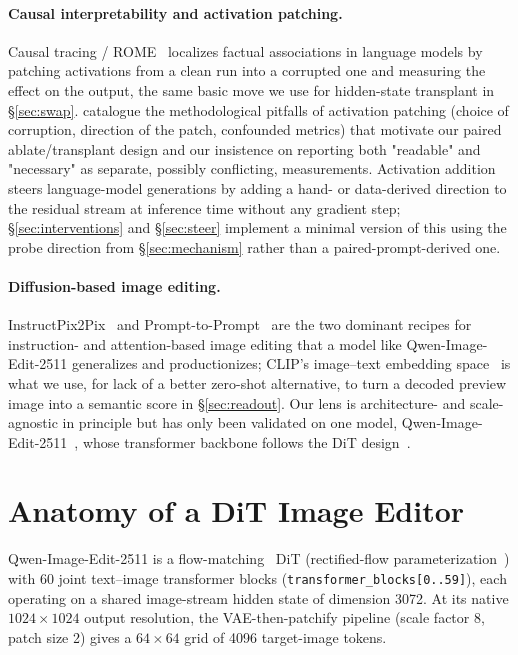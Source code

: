 \documentclass[10pt,twocolumn]{article}
\newcommand{\model}{Qwen-Image-Edit-2511}
\begin{document}
\paragraph{Causal interpretability and activation patching.} Causal
tracing / ROME~\citep{meng2022rome} localizes factual associations in
language models by patching activations from a clean run into a
corrupted one and measuring the effect on the output, the same basic
move we use for hidden-state transplant in \S\ref{sec:swap}.
\citet{heimersheim2024activation} catalogue the methodological pitfalls
of activation patching (choice of corruption, direction of the patch,
confounded metrics) that motivate our paired ablate/transplant design
and our insistence on reporting both "readable" and "necessary" as
separate, possibly conflicting, measurements. Activation
addition~\citep{turner2023actadd} steers language-model generations by
adding a hand- or data-derived direction to the residual stream at
inference time without any gradient step; \S\ref{sec:interventions} and
\S\ref{sec:steer} implement a minimal version of this using the
probe direction from \S\ref{sec:mechanism} rather than a
paired-prompt-derived one.

\paragraph{Diffusion-based image editing.} InstructPix2Pix~\citep{brooks2023instructpix2pix}
and Prompt-to-Prompt~\citep{hertz2023prompttoprompt} are the two
dominant recipes for instruction- and attention-based image editing that
a model like \model{} generalizes and productionizes; CLIP's
image--text embedding space~\citep{radford2021clip} is what we use, for
lack of a better zero-shot alternative, to turn a decoded preview image
into a semantic score in \S\ref{sec:readout}. Our lens is architecture-
and scale-agnostic in principle but has only been validated on one
model, \model{}~\citep{qwen2025image}, whose transformer backbone follows
the DiT design~\citep{peebles2023dit}.

\section{Anatomy of a DiT Image Editor}\label{sec:prelim}

\model{} is a flow-matching~\citep{lipman2023flowmatching} DiT
(rectified-flow parameterization~\citep{liu2023rectifiedflow}) with 60
joint text--image transformer blocks (\texttt{transformer\_blocks[0..59]}),
each operating on a shared image-stream hidden state of dimension 3072.
At its native $1024\times1024$ output resolution, the VAE-then-patchify
pipeline (scale factor 8, patch size 2) gives a $64\times64$ grid of
4096 target-image tokens.
\end{document}
